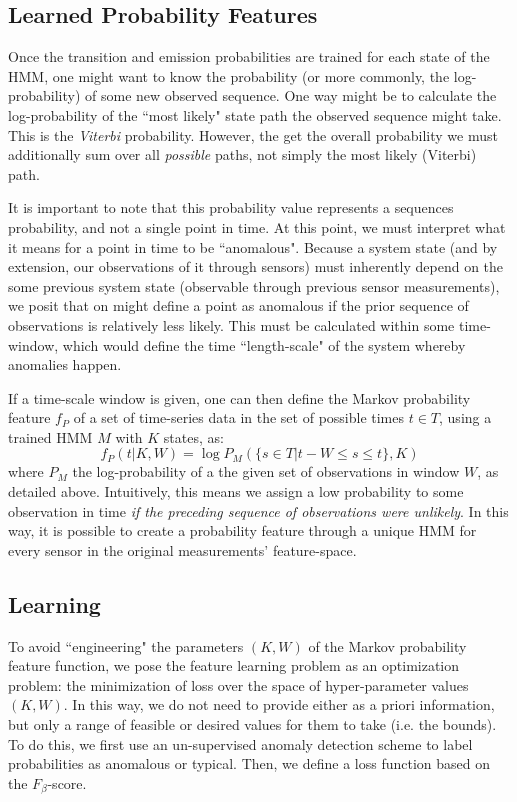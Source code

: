 \documentclass[twocolumn,10pt]{article}
\begin{document}
\subsection{Learned Probability Features}
Once the transition and emission probabilities are trained for each state of the HMM, one might want to know the probability (or more commonly, the log-probability) of some new observed sequence. One way might be to calculate the log-probability of the ``most likely" state path the observed sequence might take. This is the \textit{Viterbi} probability. However, the get the overall probability we must additionally sum over all \textit{possible} paths, not simply the most likely (Viterbi) path. 

It is important to note that this probability value represents a sequences probability, and not a single point in time. At this point, we must interpret what it means for a point in time to be ``anomalous". Because a system state (and by extension, our observations of it through sensors) must inherently depend on the some previous system state (observable through previous sensor measurements), we posit that on might define a point as anomalous if the prior sequence of observations is relatively less likely. This must be calculated within some time-window, which would define the time ``length-scale" of the system whereby anomalies happen. 

If a time-scale window is given, one can then define the Markov probability feature $f_P$ of a set of time-series data in the set of possible times $t\in T$, using a trained HMM $M$ with $K$ states, as: 
\begin{equation}
    f_P(t|K, W) = \log P_M(\{s\in T | t-W \leq s\leq t \}, K)
\end{equation} 
where $P_M$ the log-probability of a the given set of observations in window  $W$, as detailed above. Intuitively, this means we assign a low probability to some observation in time \textit{if the preceding sequence of observations were unlikely}. In this way, it is possible to create a probability feature through a unique HMM for every sensor in the original measurements' feature-space. 


\subsection{Learning}

To avoid ``engineering" the parameters $(K, W)$ of the Markov probability feature function, we pose the feature learning problem as an optimization problem: the minimization of loss over the space of hyper-parameter values $(K, W)$. In this way, we do not need to provide either as a priori information, but only a range of feasible or desired values for them to take (i.e. the bounds). To do this, we first use an un-supervised anomaly detection scheme to label probabilities as anomalous or typical. Then, we define a loss function based on the $F_{\beta}$-score. 
\end{document}
